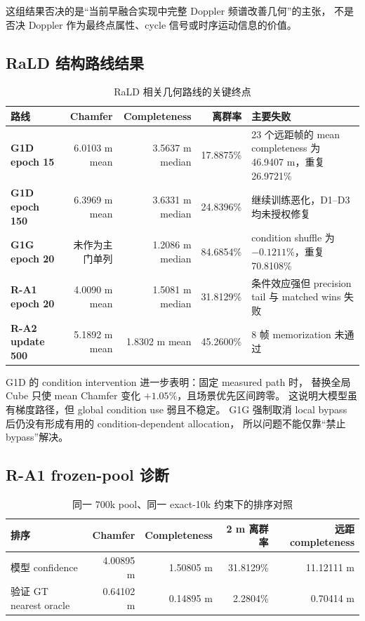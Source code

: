 \documentclass[11pt,a4paper,fontset=none]{ctexart}
\begin{document}
这组结果否决的是“当前早融合实现中完整 Doppler 频谱改善几何”的主张，
不是否决 Doppler 作为最终点属性、cycle 信号或时序运动信息的价值。

\subsection{RaLD 结构路线结果}

\begin{table}[H]
\centering
\small
\caption{RaLD 相关几何路线的关键终点}
\begin{tabularx}{\textwidth}{>{\bfseries}p{2.1cm} r r r Y}
\toprule
路线 & Chamfer & Completeness & 离群率 & 主要失败 \\
\midrule
G1D epoch 15 & 6.0103 m mean & 3.5637 m median & 17.8875\% & 23 个远距帧的 mean completeness 为 46.9407 m，重复 26.9721\% \\
G1D epoch 150 & 6.3969 m mean & 3.6331 m median & 24.8396\% & 继续训练恶化，D1--D3 均未授权修复 \\
G1G epoch 20 & 未作为主门单列 & 1.2086 m median & 84.6854\% & condition shuffle 为 $-0.1211\%$，重复 70.8108\% \\
R-A1 epoch 20 & 4.0090 m mean & 1.5081 m median & 31.8129\% & 条件效应强但 precision tail 与 matched wins 失败 \\
R-A2 update 500 & 5.1892 m mean & 1.8302 m mean & 45.2600\% & 8 帧 memorization 未通过 \\
\bottomrule
\end{tabularx}
\end{table}

G1D 的 condition intervention 进一步表明：固定 measured path 时，
替换全局 Cube 只使 mean Chamfer 变化 $+1.05\%$，且场景优先区间跨零。
这说明大模型虽有梯度路径，但 global condition use 弱且不稳定。
G1G 强制取消 local bypass 后仍没有形成有用的 condition-dependent allocation，
所以问题不能仅靠“禁止 bypass”解决。

\subsection{R-A1 frozen-pool 诊断}

\begin{table}[H]
\centering
\caption{同一 700k pool、同一 exact-10k 约束下的排序对照}
\begin{tabular}{lrrrr}
\toprule
排序 & Chamfer & Completeness & 2 m 离群率 & 远距 completeness \\
\midrule
模型 confidence & 4.00895 m & 1.50805 m & 31.8129\% & 11.12111 m \\
验证 GT nearest oracle & 0.64102 m & 0.14895 m & 2.2804\% & 0.70414 m \\
\bottomrule
\end{tabular}
\end{table}
\end{document}
